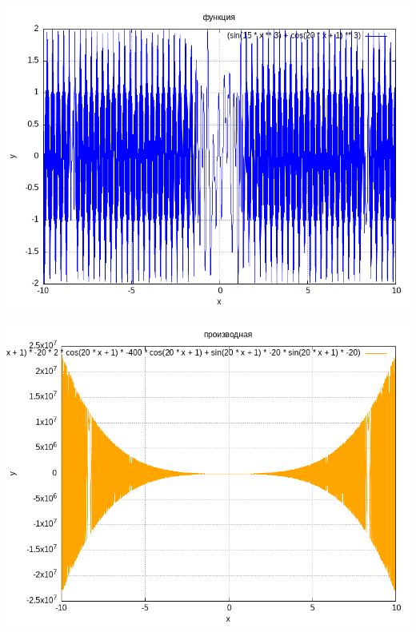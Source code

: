 \documentclass[12pt,a4paper]{extreport}
\begin{document}
\begin{minipage}{0.45\textwidth}
\centering\includegraphics[width=\linewidth]{orig_plot.png}\end{minipage}
\hfill
\begin{minipage}{0.45\textwidth}
\centering\includegraphics[width=\linewidth]{optimized_plot.png}\end{minipage}
\end{document}
